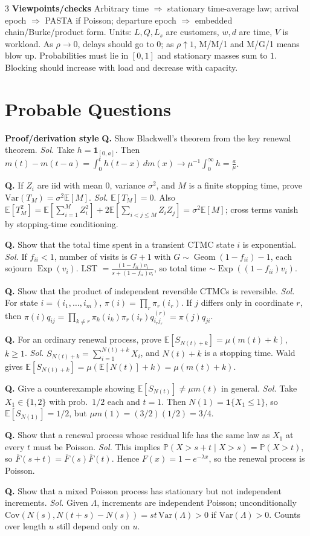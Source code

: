\documentclass[a4paper,8pt,fleqn]{extarticle}
\newcommand{\E}{\mathbb{E}}
\newcommand{\PP}{\mathbb{P}}
\newcommand{\Var}{\mathrm{Var}}
\newcommand{\Cov}{\mathrm{Cov}}
\newcommand{\1}{\mathbf{1}}
\newcommand{\barF}{\overline{F}}
\newcommand{\sub}[1]{\textbf{#1} }
\newcommand{\probq}[2]{\textbf{Q.} #1 \emph{Sol.} #2\par}
\DeclareMathOperator{\Exp}{Exp}
\DeclareMathOperator{\Geom}{Geom}
\begin{document}
\begin{multicols}{3}
\sub{Viewpoints/checks} Arbitrary time \(\Rightarrow\) stationary time-average law; arrival epoch \(\Rightarrow\) PASTA if Poisson; departure epoch \(\Rightarrow\) embedded chain/Burke/product form. Units: \(L,Q,L_s\) are customers, \(w,d\) are time, \(V\) is workload. As \(\rho\to0\), delays should go to \(0\); as \(\rho\uparrow1\), M/M/1 and M/G/1 means blow up. Probabilities must lie in \([0,1]\) and stationary masses sum to \(1\). Blocking should increase with load and decrease with capacity.

\section*{Probable Questions}
\sub{Proof/derivation style}
\probq{Show Blackwell's theorem from the key renewal theorem.}{Take \(h=\1_{[0,a]}\). Then \(m(t)-m(t-a)=\int_0^t h(t-x)\,dm(x)\to \mu^{-1}\int_0^\infty h=\frac{a}{\mu}\).}
\probq{If \(Z_i\) are iid with mean \(0\), variance \(\sigma^2\), and \(M\) is a finite stopping time, prove \(\Var(T_M)=\sigma^2\E[M]\).}{\(\E[T_M]=0\). Also \(\E[T_M^2]=\E[\sum_{i=1}^M Z_i^2]+2\E[\sum_{i<j\le M}Z_iZ_j]=\sigma^2\E[M]\); cross terms vanish by stopping-time conditioning.}
\probq{Show that the total time spent in a transient CTMC state \(i\) is exponential.}{If \(f_{ii}<1\), number of visits is \(G+1\) with \(G\sim\Geom(1-f_{ii})-1\), each sojourn \(\Exp(v_i)\). LST \(=\frac{(1-f_{ii})v_i}{s+(1-f_{ii})v_i}\), so total time \(\sim \Exp((1-f_{ii})v_i)\).}
\probq{Show that the product of independent reversible CTMCs is reversible.}{For state \(i=(i_1,\dots,i_m)\), \(\pi(i)=\prod_r \pi_r(i_r)\). If \(j\) differs only in coordinate \(r\), then \(\pi(i)q_{ij}=\prod_{k\ne r}\pi_k(i_k)\pi_r(i_r)q_{i_rj_r}^{(r)}=\pi(j)q_{ji}\).}
\probq{For an ordinary renewal process, prove \(\E[S_{N(t)+k}]=\mu(m(t)+k)\), \(k\ge1\).}{\(S_{N(t)+k}=\sum_{i=1}^{N(t)+k}X_i\), and \(N(t)+k\) is a stopping time. Wald gives \(\E[S_{N(t)+k}]=\mu(\E[N(t)]+k)=\mu(m(t)+k)\).}
\probq{Give a counterexample showing \(\E[S_{N(t)}]\neq \mu m(t)\) in general.}{Take \(X_1\in\{1,2\}\) with prob.\ \(1/2\) each and \(t=1\). Then \(N(1)=\1\{X_1\le1\}\), so \(\E[S_{N(1)}]=1/2\), but \(\mu m(1)=(3/2)(1/2)=3/4\).}
\probq{Show that a renewal process whose residual life has the same law as \(X_1\) at every \(t\) must be Poisson.}{This implies \(\PP(X>s+t\mid X>s)=\PP(X>t)\), so \(\barF(s+t)=\barF(s)\barF(t)\). Hence \(F(x)=1-e^{-\lambda x}\), so the renewal process is Poisson.}
\probq{Show that a mixed Poisson process has stationary but not independent increments.}{Given \(\Lambda\), increments are independent Poisson; unconditionally \(\Cov(N(s),N(t+s)-N(s))=st\,\Var(\Lambda)>0\) if \(\Var(\Lambda)>0\). Counts over length \(u\) still depend only on \(u\).}


\end{multicols}
\end{document}
